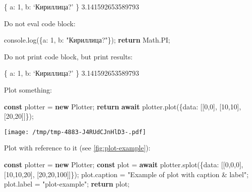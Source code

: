 \documentclass[12pt,russian,a4paper,,fleqn]{extarticle}
\newenvironment{Shaded}{}{}
\newcommand{\AttributeTok}[1]{\textcolor[rgb]{0.49,0.56,0.16}{#1}}
\newcommand{\BuiltInTok}[1]{#1}
\newcommand{\ConstantTok}[1]{\textcolor[rgb]{0.53,0.00,0.00}{#1}}
\newcommand{\ControlFlowTok}[1]{\textcolor[rgb]{0.00,0.44,0.13}{\textbf{#1}}}
\newcommand{\DataTypeTok}[1]{\textcolor[rgb]{0.56,0.13,0.00}{#1}}
\newcommand{\DecValTok}[1]{\textcolor[rgb]{0.25,0.63,0.44}{#1}}
\newcommand{\FunctionTok}[1]{\textcolor[rgb]{0.02,0.16,0.49}{#1}}
\newcommand{\KeywordTok}[1]{\textcolor[rgb]{0.00,0.44,0.13}{\textbf{#1}}}
\newcommand{\NormalTok}[1]{#1}
\newcommand{\OperatorTok}[1]{\textcolor[rgb]{0.40,0.40,0.40}{#1}}
\newcommand{\StringTok}[1]{\textcolor[rgb]{0.25,0.44,0.63}{#1}}
\theoremstyle{definition}\newtheorem{definition}{Определение}
\theoremstyle{remark}\newtheorem*{remark}{Примечание}
\numberwithin{equation}{section}
\begin{document}
\{ a: 1, b: `Кириллица?' \} 3.141592653589793

Do not eval code block:

\begin{Shaded}
\begin{Highlighting}[]
\BuiltInTok{console}\OperatorTok{.}\FunctionTok{log}\NormalTok{(\{}\DataTypeTok{a}\OperatorTok{:} \DecValTok{1}\OperatorTok{,} \DataTypeTok{b}\OperatorTok{:} \StringTok{"Кириллица?"}\NormalTok{\})}\OperatorTok{;}
\ControlFlowTok{return} \BuiltInTok{Math}\OperatorTok{.}\ConstantTok{PI}\OperatorTok{;}
\end{Highlighting}
\end{Shaded}

Do not print code block, but print results:

\{ a: 1, b: `Кириллица?' \} 3.141592653589793

Plot something:

\begin{Shaded}
\begin{Highlighting}[]
\KeywordTok{const}\NormalTok{ plotter }\OperatorTok{=} \KeywordTok{new}\NormalTok{ Plotter}\OperatorTok{;}
\ControlFlowTok{return} \ControlFlowTok{await}\NormalTok{ plotter}\OperatorTok{.}\FunctionTok{plot}\NormalTok{(\{}\DataTypeTok{data}\OperatorTok{:}\NormalTok{ [[}\DecValTok{0}\OperatorTok{,}\DecValTok{0}\NormalTok{]}\OperatorTok{,}\NormalTok{ [}\DecValTok{10}\OperatorTok{,}\DecValTok{10}\NormalTok{]}\OperatorTok{,}\NormalTok{ [}\DecValTok{20}\OperatorTok{,}\DecValTok{20}\NormalTok{]]\})}\OperatorTok{;}
\end{Highlighting}
\end{Shaded}

\texttt{[image: /tmp/tmp-4883-J4RUdCJnHlD3-.pdf]}

Plot with reference to it (see \ref{fig:plot-example}):

\begin{Shaded}
\begin{Highlighting}[]
\KeywordTok{const}\NormalTok{ plotter }\OperatorTok{=} \KeywordTok{new}\NormalTok{ Plotter}\OperatorTok{;}
\KeywordTok{const}\NormalTok{ plot }\OperatorTok{=} \ControlFlowTok{await}\NormalTok{ plotter}\OperatorTok{.}\FunctionTok{splot}\NormalTok{(\{}\DataTypeTok{data}\OperatorTok{:}\NormalTok{ [[}\DecValTok{0}\OperatorTok{,}\DecValTok{0}\OperatorTok{,}\DecValTok{0}\NormalTok{]}\OperatorTok{,}\NormalTok{ [}\DecValTok{10}\OperatorTok{,}\DecValTok{10}\OperatorTok{,}\DecValTok{20}\NormalTok{]}\OperatorTok{,}\NormalTok{ [}\DecValTok{20}\OperatorTok{,}\DecValTok{20}\OperatorTok{,}\DecValTok{100}\NormalTok{]]\})}\OperatorTok{;}
\NormalTok{plot}\OperatorTok{.}\AttributeTok{caption} \OperatorTok{=} \StringTok{"Example of plot with caption \& label"}\OperatorTok{;}
\NormalTok{plot}\OperatorTok{.}\AttributeTok{label} \OperatorTok{=} \StringTok{"plot{-}example"}\OperatorTok{;}
\ControlFlowTok{return}\NormalTok{ plot}\OperatorTok{;}
\end{Highlighting}
\end{Shaded}
\end{document}
